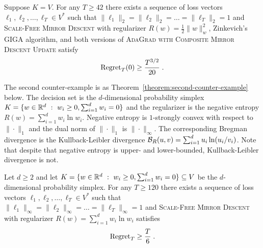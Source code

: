 \begin{theorem}
\label{theorem:first-counter-example}
Suppose $K = V$. For any $T \ge 42$ there exists a sequence of loss vectors
$\ell_1, \ell_2, \dots, \ell_T \in V^*$ such that $\|\ell_1\|_2 = \|\ell_2\|_2
= \dots = \|\ell_T\|_2 = 1$ and \textsc{Scale-Free Mirror Descent} with
regularizer $R(w) = \frac{1}{2}\|w\|_w^2$, Zinkevich's \textsc{GIGA} algorithm,
and both versions of \textsc{AdaGrad with Composite Mirror Descent Update}
satisfy
$$
\operatorname{Regret}_T(0) \ge \frac{T^{3/2}}{20} \; .
$$
\end{theorem}

The second counter-example is as Theorem~\ref{theorem:second-counter-example}
below.  The decision set is the $d$-dimensional probability simplex $K = \{ w
\in \mathbb{R}^d ~:~ w_i \ge 0, \sum_{i=1}^d w_i = 0 \}$ and the regularizer is the
negative entropy $R(w) = \sum_{i=1}^d w_i \ln w_i$.  Negative entropy is
$1$-strongly convex with respect to $\|\cdot\|_1$ and the dual norm of
$\|\cdot\|_1$ is \mbox{$\|\cdot\|_\infty$}.  The corresponding Bregman
divergence is the Kullback-Leibler divergence $\mathcal{B}_R(u,v) = \sum_{i=1}^d u_i
\ln(u_i/v_i)$.  Note that despite that negative entropy is upper- and
lower-bounded, Kullback-Leibler divergence is not.

\begin{theorem}
\label{theorem:second-counter-example}
Let $d \ge 2$ and let $K = \{ w \in \mathbb{R}^d ~:~ w_i \ge 0, \sum_{i=1}^d w_i = 0 \}
\subseteq V$ be the $d$-dimensional probability simplex.  For any $T \ge 120$
there exists a sequence of loss vectors $\ell_1, \ell_2, \dots, \ell_T \in V^*$
such that $\|\ell_1\|_\infty = \|\ell_2\|_\infty = \dots = \|\ell_T\|_\infty =
1$ and \textsc{Scale-Free Mirror Descent} with regularizer $R(w) = \sum_{i=1}^d
w_i \ln w_i$ satisfies
$$
\operatorname{Regret}_T \ge \frac{T}{6} \; .
$$
\end{theorem}
